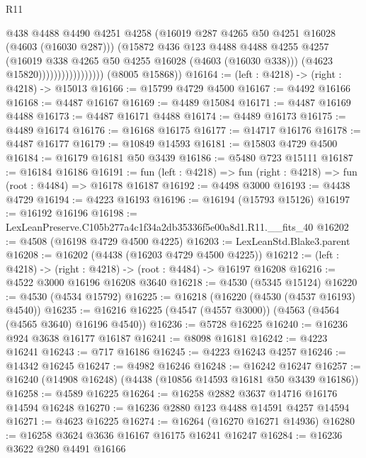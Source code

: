 \begin{lexlean}{R11}
\begin{coremodule}
                                    @438
                                    @4488
                                    @4490
                                    @4251
                                    @4258
                                    (@16019 @287 @4265 @50 @4251 @16028 (@4603 (@16030 @287)))
                                    (@15872
                                      @436
                                      @123
                                      @4488
                                      @4488
                                      @4255
                                      @4257
                                      (@16019 @338 @4265 @50 @4255 @16028 (@4603 (@16030 @338)))
                                      (@4623 @15820)))))))))))))))))
      (@8005 @15868))
@16164 := (left : @4218) -> (right : @4218) -> @15013
@16166 := @15799 @4729 @4500
@16167 := @4492 @16166
@16168 := @4487 @16167
@16169 := @4489 @15084
@16171 := @4487 @16169 @4488
@16173 := @4487 @16171 @4488
@16174 := @4489 @16173
@16175 := @4489 @16174
@16176 := @16168 @16175
@16177 := @14717 @16176
@16178 := @4487 @16177
@16179 := @10849 @14593
@16181 := @15803 @4729 @4500
@16184 := @16179 @16181 @50 @3439
@16186 := @5480 @723 @15111
@16187 := @16184 @16186
@16191 := fun (left : @4218) => fun (right : @4218) => fun (root : @4484) => @16178 @16187
@16192 := @4498 @3000
@16193 := @4438 @4729
@16194 := @4223 @16193
@16196 := @16194 (@15793 @15126)
@16197 := @16192 @16196
@16198 := LexLeanPreserve.C105b277a4c1f34a2db35336f5e00a8d1.R11.__fits_40
@16202 := @4508 (@16198 @4729 @4500 @4225)
@16203 := LexLeanStd.Blake3.parent
@16208 := @16202 (@4438 (@16203 @4729 @4500 @4225))
@16212 := (left : @4218) -> (right : @4218) -> (root : @4484) -> @16197 @16208
@16216 := @4522 @3000 @16196 @16208 @3640
@16218 := @4530 (@5345 @15124)
@16220 := @4530 (@4534 @15792)
@16225 := @16218 (@16220 (@4530 (@4537 @16193) @4540))
@16235 := @16216 @16225 (@4547 (@4557 @3000)) (@4563 (@4564 (@4565 @3640) @16196 @4540))
@16236 := @5728 @16225
@16240 := @16236 @924 @3638 @16177 @16187
@16241 := @8098 @16181
@16242 := @4223 @16241
@16243 := @717 @16186
@16245 := @4223 @16243 @4257
@16246 := @14342 @16245
@16247 := @4982 @16246
@16248 := @16242 @16247
@16257 := @16240 (@14908 @16248) (@4438 (@10856 @14593 @16181 @50 @3439 @16186))
@16258 := @4589 @16225
@16264 := @16258 @2882 @3637 @14716 @16176 @14594 @16248
@16270 := @16236 @2880 @123 @4488 @14591 @4257 @14594
@16271 := @4623 @16225
@16274 := @16264 (@16270 @16271 @14936)
@16280 := @16258 @3624 @3636 @16167 @16175 @16241 @16247
@16284 := @16236 @3622 @280 @4491 @16166

\end{coremodule}
\end{lexlean}
